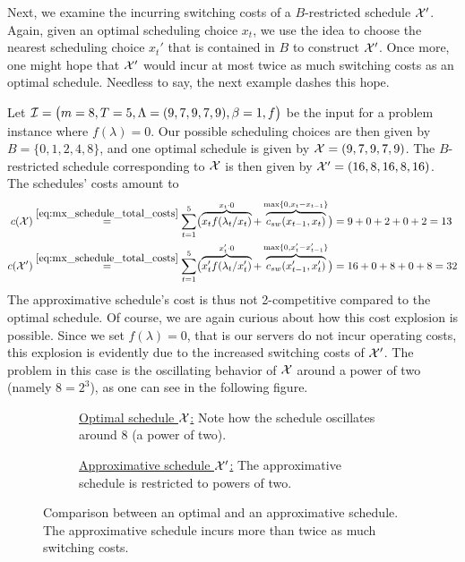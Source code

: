 Next, we examine the incurring switching costs of a $B$-restricted schedule $\mathcal{X}'$. Again, given an optimal scheduling choice $x_t$, we use the idea to choose the nearest scheduling choice $x_t'$ that is contained in $B$ to construct $\mathcal{X}'$. Once more, one might hope that $\mathcal{X}'$ would incur at most twice as much switching costs as an optimal schedule. Needless to say, the next example dashes this hope.
\begin{exmpl}\label{exmpl:oscillating_schedule}
Let $\mathcal{I}=\bigl(m=8,T=5,\Lambda=(9,7,9,7,9),\beta=1,f\bigr)$ be the input for a problem instance where $f(\lambda)=0$. Our possible scheduling choices are then given by $B=\{0,1,2,4,8\}$, and one optimal schedule is given by $\mathcal{X}=(9,7,9,7,9)$. The $B$-restricted schedule corresponding to $\mathcal{X}$ is then given by $\mathcal{X}'=(16,8,16,8,16)$. The schedules' costs amount to
\begin{align*}
	c(\mathcal{X})&\stackrel{\eqref{eq:mx_schedule_total_costs}}{=}\sum\limits_{t=1}^{5}\bigl(\overbrace{x_tf(\lambda_t/x_t)}^{x_t\cdot 0}+\overbrace{c_{sw}(x_{t-1},x_t)}^{\max\{0,x_t-x_{t-1}\}}\bigr)=9+0+2+0+2=13\\
	c(\mathcal{X}')&\stackrel{\eqref{eq:mx_schedule_total_costs}}{=}\sum\limits_{t=1}^{5}\bigl(\overbrace{x_t'f(\lambda_t/x_t')}^{x_t'\cdot 0}+\overbrace{c_{sw}(x_{t-1}',x_t')}^{\max\{0,x_t'-x_{t-1}'\}}\bigr)=16+0+8+0+8=32
\end{align*}
The approximative schedule's cost is thus not 2-competitive compared to the optimal schedule. Of course, we are again curious about how this cost explosion is possible. Since we set $f(\lambda)=0$, that is our servers do not incur operating costs, this explosion is evidently due to the increased switching costs of $\mathcal{X}'$. The problem in this case is the oscillating behavior of $\mathcal{X}$ around a power of two (namely $8=2^3$), as one can see in the following figure. 
\begin{figure}[H]
\captionsetup[subfigure]{labelformat=empty}
\begin{subfigure}[b]{0.5\textwidth}

	\caption{\underline{Optimal schedule $\mathcal{X}$:} Note how the schedule oscillates around 8 (a power of two).}
\end{subfigure}
\hfill
\begin{subfigure}[b]{0.5\textwidth}

	\caption{\underline{Approximative schedule $\mathcal{X}'$:} The approximative schedule is restricted to powers of two.}
\end{subfigure}
\caption{Comparison between an optimal and an approximative schedule. The approximative schedule incurs more than twice as much switching costs.}
\label{fig:adaption-schedule}
\end{figure}
\end{exmpl}
